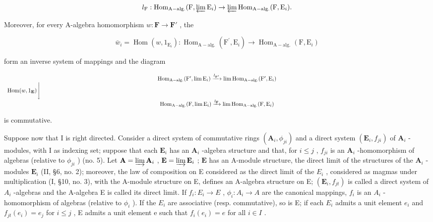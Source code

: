 \[
l _ {\mathrm{F}}: \operatorname{Hom} _ {\mathrm{A-alg.}} (\mathrm{F}, \varprojlim \mathrm{E} _ {i}) \rightarrow \varprojlim \operatorname{Hom} _ {\mathrm{A-alg.}} (\mathrm{F}, \mathrm{E} _ {i}).
\]

Moreover, for every A-algebra homomorphism \(w: \mathbf{F} \to \mathbf{F}'\) , the

\[
\bar {w} _ {i} = \operatorname{Hom} (w, 1 _ {\mathrm{E} _ {i}}): \operatorname{Hom} _ {\mathrm{A-alg.}} (\mathrm{F} ^ {\prime}, \mathrm{E} _ {i}) \rightarrow \operatorname{Hom} _ {\mathrm{A-alg.}} (\mathrm{F}, \mathrm{E} _ {i})
\]

form an inverse system of mappings and the diagram

\[
\begin{array}{c} \operatorname{Hom} _ {\mathrm{A-alg.}} (\mathrm{F} ^ {\prime}, \lim \mathrm{E} _ {i}) \xrightarrow {l _ {\mathbf {F} ^ {\prime}}} \lim \operatorname{Hom} _ {\mathrm{A-alg.}} (\mathrm{F} ^ {\prime}, \mathrm{E} _ {i}) \\ \operatorname{Hom} (w, 1 _ {\mathbf {E}}) \Biggl \downarrow \qquad \qquad \qquad \qquad \qquad \qquad \qquad \qquad \qquad \qquad \qquad \qquad \qquad \qquad \qquad \qquad \qquad \qquad \qquad \qquad \qquad \qquad \qquad \qquad \qquad \qquad \qquad \qquad \qquad \qquad \qquad \qquad \qquad \qquad \\ \operatorname{Hom} _ {\mathrm{A-alg.}} (\mathrm{F}, \lim \mathrm{E} _ {i}) \xrightarrow {l _ {\mathbf {F}}} \lim \operatorname{Hom} _ {\mathrm{A-alg.}} (\mathrm{F}, \mathrm{E} _ {i}) \end{array}
\]

is commutative.

Suppose now that I is right directed. Consider a direct system of commutative rings \((\mathbf{A}_i, \phi_{ji})\) and a direct system \((\mathbf{E}_i, f_{ji})\) of \(\mathbf{A}_i\) -modules, with I as indexing set; suppose that each \(\mathbf{E}_i\) has an \(\mathbf{A}_i\) -algebra structure and that, for \(i \leqslant j\) , \(f_{ji}\) is an \(\mathbf{A}_i\) -homomorphism of algebras (relative to \(\phi_{ji}\) ) (no. 5). Let \(\mathbf{A} = \varinjlim \mathbf{A}_i\) , \(\mathbf{E} = \varinjlim \mathbf{E}_i\) ; \(\mathbf{E}\) has an A-module structure, the direct limit of the structures of the \(\mathbf{A}_i\) -modules \(\mathbf{E}_i\) (II, §6, no. 2); moreover, the law of composition on E considered as the direct limit of the \(E_{i}\) , considered as magmas under multiplication (I, §10, no. 3), with the A-module structure on E, defines an A-algebra structure on E; \((\mathbf{E}_{i}, f_{jt})\) is called a direct system of \(A_{i}\) -algebras and the A-algebra E is called its direct limit. If \(f_{i}: E_{i} \to E\) , \(\phi_{i}: A_{i} \to A\) are the canonical mappings, \(f_{i}\) is an \(A_{i}\) -homomorphism of algebras (relative to \(\phi_{i}\) ). If the \(E_{i}\) are associative (resp. commutative), so is E; if each \(E_{i}\) admits a unit element \(e_{i}\) and \(f_{jt}(e_{i}) = e_{j}\) for \(i \leqslant j\) , E admits a unit element e such that \(f_{i}(e_{i}) = e\) for all \(i \in I\) .

